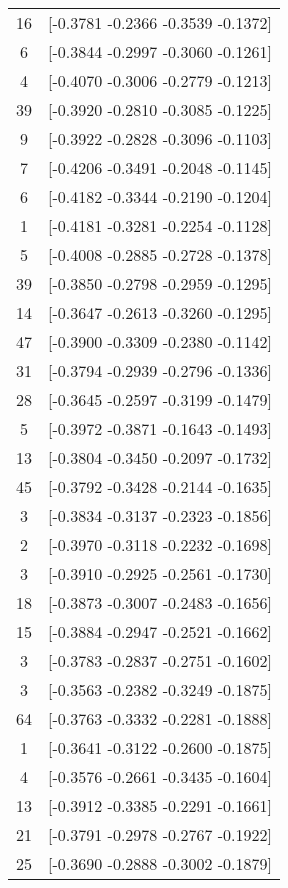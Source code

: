 \documentclass[12pt, fullpage,letterpaper]{article}
\begin{document}
\begin{enumerate}
\begin{enumerate}
{\begin{longtable}{|c|c|}
			 16 &  [-0.3781 -0.2366 -0.3539 -0.1372] \\
			  6 &  [-0.3844 -0.2997 -0.3060 -0.1261] \\
			  4 &  [-0.4070 -0.3006 -0.2779 -0.1213] \\
			 39 &  [-0.3920 -0.2810 -0.3085 -0.1225] \\
			  9 &  [-0.3922 -0.2828 -0.3096 -0.1103] \\
			  7 &  [-0.4206 -0.3491 -0.2048 -0.1145] \\
			  6 &  [-0.4182 -0.3344 -0.2190 -0.1204] \\
			  1 &  [-0.4181 -0.3281 -0.2254 -0.1128] \\
			  5 &  [-0.4008 -0.2885 -0.2728 -0.1378] \\
			 39 &  [-0.3850 -0.2798 -0.2959 -0.1295] \\
			 14 &  [-0.3647 -0.2613 -0.3260 -0.1295] \\
			 47 &  [-0.3900 -0.3309 -0.2380 -0.1142] \\
			 31 &  [-0.3794 -0.2939 -0.2796 -0.1336] \\
			 28 &  [-0.3645 -0.2597 -0.3199 -0.1479] \\
			  5 &  [-0.3972 -0.3871 -0.1643 -0.1493] \\
			 13 &  [-0.3804 -0.3450 -0.2097 -0.1732] \\
			 45 &  [-0.3792 -0.3428 -0.2144 -0.1635] \\
			  3 &  [-0.3834 -0.3137 -0.2323 -0.1856] \\
			  2 &  [-0.3970 -0.3118 -0.2232 -0.1698] \\
			  3 &  [-0.3910 -0.2925 -0.2561 -0.1730] \\
			 18 &  [-0.3873 -0.3007 -0.2483 -0.1656] \\
			 15 &  [-0.3884 -0.2947 -0.2521 -0.1662] \\
			  3 &  [-0.3783 -0.2837 -0.2751 -0.1602] \\
			  3 &  [-0.3563 -0.2382 -0.3249 -0.1875] \\
			 64 &  [-0.3763 -0.3332 -0.2281 -0.1888] \\
			  1 &  [-0.3641 -0.3122 -0.2600 -0.1875] \\
			  4 &  [-0.3576 -0.2661 -0.3435 -0.1604] \\
			 13 &  [-0.3912 -0.3385 -0.2291 -0.1661] \\
			 21 &  [-0.3791 -0.2978 -0.2767 -0.1922] \\
			 25 &  [-0.3690 -0.2888 -0.3002 -0.1879] \\

\end{longtable}}
\end{enumerate}
\end{enumerate}
\end{document}
